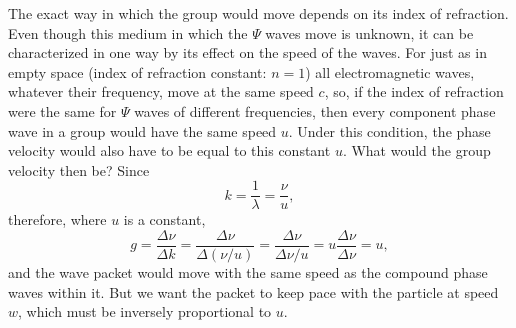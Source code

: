 The exact way in which the group would move depends on its index of
refraction. Even though this medium in which the $\Psi$ waves move is
unknown, it can be characterized in one way by its effect on the speed
of the waves. For just as in empty space (index of refraction constant:
$n = 1$) all electromagnetic waves, whatever their frequency, move
at the same speed $c$, so, if the index of refraction were the same
for $\Psi$ waves of different frequencies, then every component phase
wave in a group would have the same speed $u$. Under this
condition, the phase velocity would also have to be equal to this
constant $u$. What would the group velocity then be? Since
\begin{equation*}
k = \frac{1}{\lambda} = \frac{\nu}{u},
\end{equation*}
therefore, where $u$ is a constant,
\begin{equation*}
g = \frac{\Delta\nu}{\Delta k} = \frac{\Delta\nu}{\Delta(\nu/u)} =
\frac{\Delta\nu}{\Delta\nu/u} = u\frac{\Delta\nu}{\Delta\nu} = u,
\end{equation*}
and the wave packet would move with the same speed as the compound phase
waves within it. But we want the packet to keep pace with the particle
at speed $w$, which must be inversely proportional to $u$.

